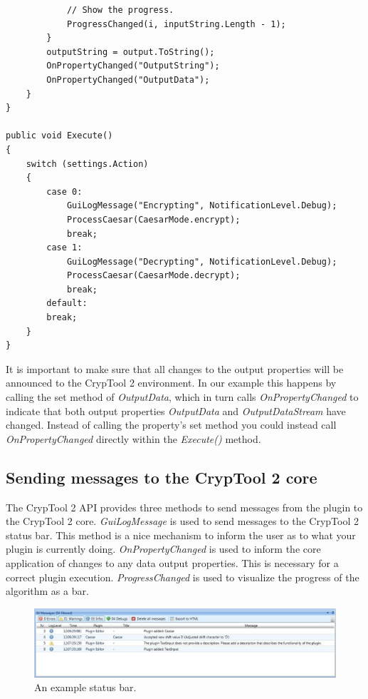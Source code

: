\begin{lstlisting}
			// Show the progress.
			ProgressChanged(i, inputString.Length - 1);
		}
		outputString = output.ToString();
		OnPropertyChanged("OutputString");
		OnPropertyChanged("OutputData");
	}
}

public void Execute()
{
	switch (settings.Action)
	{
		case 0:
			GuiLogMessage("Encrypting", NotificationLevel.Debug);
			ProcessCaesar(CaesarMode.encrypt);
			break;
		case 1:
			GuiLogMessage("Decrypting", NotificationLevel.Debug);
			ProcessCaesar(CaesarMode.decrypt);
			break;
		default:
    	break;
	}
}
\end{lstlisting}

It is important to make sure that all changes to the output properties will be announced to the CrypTool 2 environment. In our example this happens by calling the set method of \textit{OutputData}, which in turn calls \textit{OnPropertyChanged} to indicate that both output properties \textit{OutputData} and \textit{OutputDataStream} have changed. Instead of calling the property's set method you could instead call \textit{OnPropertyChanged} directly within the \textit{Execute()} method.

\subsection{Sending messages to the CrypTool 2 core}
\label{sec:SendingMessagesToTheCrypTool2Core}

The CrypTool 2 API provides three methods to send messages from the plugin to the CrypTool 2 core. \textit{GuiLogMessage} is used to send messages to the CrypTool 2 status bar. This method is a nice mechanism to inform the user as to what your plugin is currently doing. \textit{OnPropertyChanged} is used to inform the core application of changes to any data output properties. This is necessary for a correct plugin execution. \textit{ProgressChanged} is used to visualize the progress of the algorithm as a bar.

\begin{figure}[h]
	\centering
		\includegraphics[width=1.00\textwidth]{figures/status_bar.jpg}
	\caption{An example status bar.}
	\label{fig:status_bar}
\end{figure}

